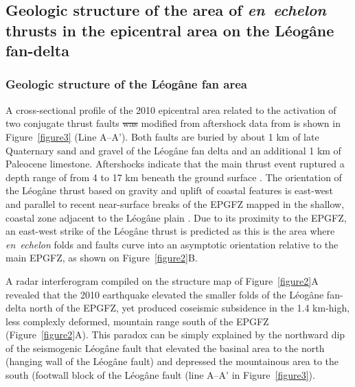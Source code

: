 \documentclass[linenumbers,draft]{agujournal}
\providecommand{\DIFaddtex}[1]{{\protect\color{blue}\uwave{#1}}} %
\providecommand{\DIFdeltex}[1]{{\protect\color{red}\sout{#1}}}                      %
\providecommand{\DIFaddbegin}{} %
\providecommand{\DIFaddend}{} %
\providecommand{\DIFdelbegin}{} %
\providecommand{\DIFdelend}{} %
\providecommand{\DIFadd}[1]{\texorpdfstring{\DIFaddtex{#1}}{#1}} %
\providecommand{\DIFdel}[1]{\texorpdfstring{\DIFdeltex{#1}}{}} %
\begin{document}
\subsection{Geologic structure of the area of \textit{en~echelon} thrusts in the epicentral area on the L\'eog\^ane fan-delta}
\subsubsection{Geologic structure of the L\'eog\^ane fan area}
A cross-sectional profile of the 2010 epicentral area related to the activation of two conjugate thrust faults \DIFdelbegin \DIFdel{was }\DIFdelend \DIFaddbegin \DIFadd{is }\DIFaddend modified from aftershock data from \citet{douilly2013crustal,douilly2015three} \DIFaddbegin \DIFadd{and }\DIFaddend is shown in Figure~\ref{figure3} (Line A--A'). Both faults are buried by about 1 km of late Quaternary sand and gravel of the L\'eog\^ane fan delta \citep{kocel2016near} and an additional 1 km of Paleocene limestone. Aftershocks indicate that the main thrust event ruptured a depth range of from 4 to 17 km beneath the ground surface \citep{douilly2013crustal,douilly2015three}. The orientation of the L\'eog\^ane thrust based on gravity and uplift of coastal features is east-west and parallel to recent near-surface breaks of the EPGFZ mapped in the shallow, coastal zone adjacent to the L\'eog\^ane plain \citep{hornbach2010high}. Due to its proximity to the EPGFZ, an east-west strike of the L\'eog\^ane thrust is predicted as this is the area where \textit{en~echelon} folds and faults curve into an asymptotic orientation relative to the main EPGFZ, as shown on Figure~\ref{figure2}B.

A radar interferogram compiled on the structure map of Figure~\ref{figure2}A revealed that the 2010 earthquake elevated the smaller folds of the L\'eog\^ane fan-delta north of the EPGFZ, yet produced coseismic subsidence in the 1.4 km-high, less complexly deformed, mountain range south of the EPGFZ \citep{hashimoto2011fan} (Figure~\ref{figure2}A). This paradox can be simply explained by the northward dip of the seismogenic L\'eog\^ane fault that elevated the basinal area to the north (hanging wall of the L\'eog\^ane fault) and depressed the mountainous area to the south (footwall block of the L\'eog\^ane fault (line A--A' in Figure~\ref{figure3}). 
\end{document}
